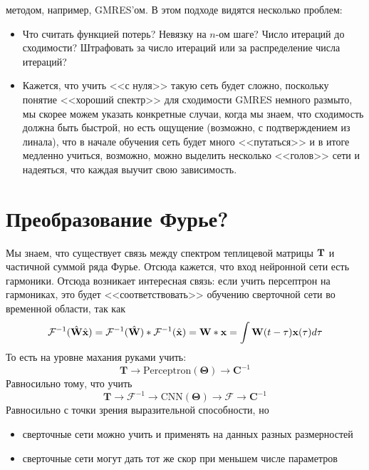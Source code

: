 \documentclass[a4paper, 12pt]{article}
\begin{document}
\begin{itemize}
        методом, например, GMRES'ом. В этом подходе видятся 
        несколько проблем:
        \begin{itemize}
            \item Что считать функцией потерь?
                Невязку на $n$-ом шаге? Число итераций до сходимости?
                Штрафовать за число итераций или за распределение
                числа итераций?
            \item Кажется, что учить <<с нуля>> такую сеть
                будет сложно, поскольку понятие <<хороший спектр>>
                для сходимости GMRES немного размыто, мы скорее
                можем указать конкретные случаи, когда
                мы знаем, что сходимость должна быть быстрой, но
                есть ощущение (возможно, с подтверждением из линала), 
                что в начале обучения сеть будет
                много <<путаться>> и в итоге медленно учиться,
                возможно, можно выделить несколько <<голов>> сети
                и надеяться, что каждая выучит свою зависимость.
        \end{itemize}
\end{itemize}

\section{Преобразование Фурье?}

Мы знаем, что существует связь между
спектром теплицевой матрицы $\textbf T$ и частичной суммой ряда Фурье.
Отсюда кажется, что вход нейронной сети есть 
гармоники. Отсюда
возникает интересная связь:
если учить персептрон на гармониках, это
будет <<соответствовать>> обучению сверточной сети во временной области, так
как
\[
    \mathcal F^{-1}(\hat{\textbf{W}}\hat{\textbf{x}})
    =
    \mathcal F^{-1}(\hat{\textbf{W}}) * \mathcal F^{-1}(\hat{\textbf{x}})
    =
    \textbf W * \textbf x
    =
    \int \textbf W(t-\tau)\textbf x(\tau) d\tau
\]
То есть на уровне махания руками учить:
\[
    \textbf{T}\to \mathrm{Perceptron}(\boldsymbol\Theta) \to \textbf{C}^{-1}
\]
Равносильно тому, что учить
\[
    \textbf{T}\to\mathcal F^{-1}\to\mathrm{CNN}(\boldsymbol \Theta) 
    \to\mathcal F\to \textbf{C}^{-1}
\]
Равносильно с точки зрения выразительной способности,
но 
\begin{itemize}
    \item сверточные сети можно учить и применять на данных
        разных размерностей
    \item сверточные сети могут дать тот же скор при меньшем числе параметров
\end{itemize}
\end{document}
